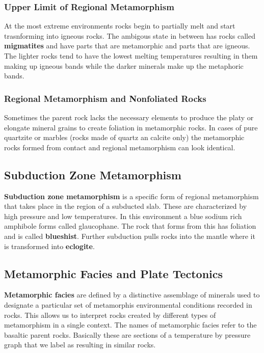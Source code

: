 \documentclass{article}
\begin{document}

\subsubsection{Upper Limit of Regional Metamorphism} %
\label{sub:upper_limit_of_regional_metamorphism}
At the most extreme environments rocks begin to partially melt and start trasnforming into igneous rocks. The ambigous state in between has rocks called \textbf{migmatites} and have parts that are metamorphic and parts that are igneous. The lighter rocks tend to have the lowest melting temperatures resulting in them making up igneous bands while the darker minerals make up the metaphoric bands.

\subsubsection{Regional Metamorphism and Nonfoliated Rocks} %
\label{sub:regional_metamorphism_and_nonfoliated_rocks}
Sometimes the parent rock lacks the necessary elements to produce the platy or elongate mineral grains to create foliation in metamorphic rocks. In cases of pure quartzite or marbles (rocks made of quartz an calcite only) the metamorphic rocks formed from contact and regional metamorphism can look identical.
\subsection{Subduction Zone Metamorphism} %
\label{sub:subduction_zone_metamorphism}
\textbf{Subduction zone metamorphism} is a specific form of regional metamorphism that takes place in the region of a subducted slab. These are characterized by high pressure and low temperatures. In this environment a blue sodium rich amphibole forms called glaucophane. The rock that forms from this has foliation and is called \textbf{blueshist}. Further subduction pulls rocks into the mantle where it is transformed into \textbf{eclogite}.

\subsection{Metamorphic Facies and Plate Tectonics} %
\label{sub:metamorphic_facies_and_plate_tectonics}
\textbf{Metamorphic facies} are defined by a distinctive assemblage of minerals used to designate a particular set of metamorphis environmental conditions recorded in rocks. This allows us to interpret rocks created by different types of metamorphism in a single context. The names of metamorphic facies refer to the basaltic parent rocks. Basically these are sections of a temperature by pressure graph that we label as resulting in similar rocks.
\end{document}
